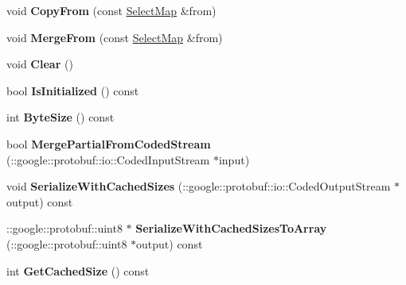 \begin{DoxyCompactItemize}
\item 
\hypertarget{class_select_map_abd53ee958264d56ea93505f1998ff85a}{void {\bfseries Copy\-From} (const \hyperlink{class_select_map}{Select\-Map} \&from)}\label{class_select_map_abd53ee958264d56ea93505f1998ff85a}

\item 
\hypertarget{class_select_map_a5a6cbf4a40503eb8b2f31c8a81fd2926}{void {\bfseries Merge\-From} (const \hyperlink{class_select_map}{Select\-Map} \&from)}\label{class_select_map_a5a6cbf4a40503eb8b2f31c8a81fd2926}

\item 
\hypertarget{class_select_map_a6c74d9780a2f9f3e025ad300bf9f8040}{void {\bfseries Clear} ()}\label{class_select_map_a6c74d9780a2f9f3e025ad300bf9f8040}

\item 
\hypertarget{class_select_map_a32ef5cff913db1dff34677313d8fca17}{bool {\bfseries Is\-Initialized} () const }\label{class_select_map_a32ef5cff913db1dff34677313d8fca17}

\item 
\hypertarget{class_select_map_a896f4de61429d66f7ca721665252540f}{int {\bfseries Byte\-Size} () const }\label{class_select_map_a896f4de61429d66f7ca721665252540f}

\item 
\hypertarget{class_select_map_ad1efa76b6521f8ec525aa955d4f8cbec}{bool {\bfseries Merge\-Partial\-From\-Coded\-Stream} (\-::google\-::protobuf\-::io\-::\-Coded\-Input\-Stream $\ast$input)}\label{class_select_map_ad1efa76b6521f8ec525aa955d4f8cbec}

\item 
\hypertarget{class_select_map_ad97d14500a1bfbe5d7d762c3a37796c7}{void {\bfseries Serialize\-With\-Cached\-Sizes} (\-::google\-::protobuf\-::io\-::\-Coded\-Output\-Stream $\ast$output) const }\label{class_select_map_ad97d14500a1bfbe5d7d762c3a37796c7}

\item 
\hypertarget{class_select_map_a7d09c9ffc748072867a1014e3c781292}{\-::google\-::protobuf\-::uint8 $\ast$ {\bfseries Serialize\-With\-Cached\-Sizes\-To\-Array} (\-::google\-::protobuf\-::uint8 $\ast$output) const }\label{class_select_map_a7d09c9ffc748072867a1014e3c781292}

\item 
\hypertarget{class_select_map_aa228e910522dc2fc1b80e28c3f1fe05c}{int {\bfseries Get\-Cached\-Size} () const }\label{class_select_map_aa228e910522dc2fc1b80e28c3f1fe05c}


\end{DoxyCompactItemize}
